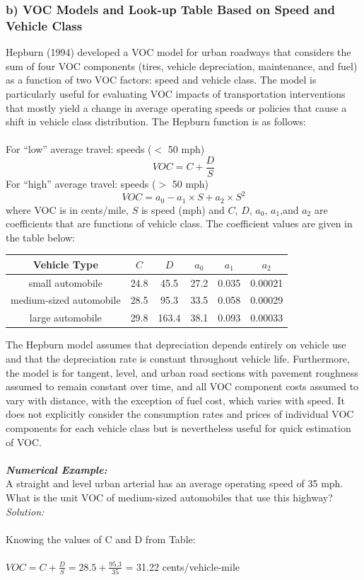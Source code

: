\subsubsection{b) VOC Models and Look-up Table Based on Speed and Vehicle Class}
Hepburn (1994) developed a VOC model for urban roadways that considers the sum of four VOC components (tires, vehicle depreciation, maintenance, and fuel) as a function of two VOC factors: speed and vehicle class. The model is particularly useful for evaluating VOC impacts of transportation interventions that mostly yield a change in average operating speeds or policies that cause a shift in vehicle class distribution. The Hepburn function is as follows:\\\\
For “low” average travel: speeds ($ < $ 50 mph)
\begin{equation}
	VOC = C + \frac{D}{S}
\end{equation}
For “high” average travel: speeds ($ > $ 50 mph)
\begin{equation}
	VOC = a_0 - a_1 \times S + a_2 \times S^2
\end{equation}
where VOC is in cents/mile, $ S $ is speed (mph) and $ C $, $ D $, $ a_0 $, $ a_1 $,and $ a_2 $ are coefficients that are functions of vehicle class. The coefficient values are given in the table below:
\begin{center}
	\begin{tabular}{c c c c c c}
		Vehicle Type & $ C $ & $ D $ & $ a_0 $ & $ a_1 $ & $ a_2 $\\
		\hline
		small automobile & 24.8 & 45.5 & 27.2 & 0.035 & 0.00021\\
		medium-sized automobile & 28.5 & 95.3 & 33.5 & 0.058 & 0.00029\\
		large automobile & 29.8 & 163.4 & 38.1 & 0.093 & 0.00033
	\end{tabular}
\end{center}
The Hepburn model assumes that depreciation depends
entirely on vehicle use and that the depreciation rate is constant throughout vehicle life. Furthermore, the model is for tangent, level, and urban road sections with pavement roughness assumed to remain constant over time, and all VOC component costs assumed to vary with distance, with the exception of fuel cost, which varies with speed. It does not explicitly consider the consumption rates and prices of individual VOC components for each vehicle class but is nevertheless useful for quick estimation of VOC.\\\\
\textbf{\textit{Numerical Example:}}\\
A straight and level urban arterial has an average operating speed of 35 mph. What is the unit VOC of medium-sized automobiles that use this highway?\\
\textit{Solution:}\\\\
Knowing the values of C and D from Table:\\\\
$ VOC = C + \frac{D}{S} = 28.5 + \frac{95.3}{35} $ = 31.22 cents/vehicle-mile
